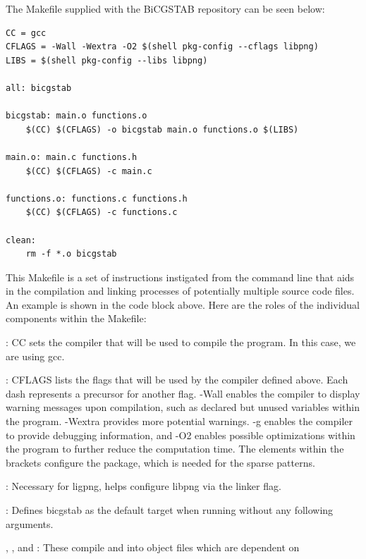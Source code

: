 \documentclass[12pt]{article}
\begin{document}
	The Makefile supplied with the BiCGSTAB repository can be seen below:

 	\begin{mdframed}[style=myboxstyleTerminal1]
		\begin{verbatim}
CC = gcc
CFLAGS = -Wall -Wextra -O2 $(shell pkg-config --cflags libpng)
LIBS = $(shell pkg-config --libs libpng)

all: bicgstab

bicgstab: main.o functions.o
	$(CC) $(CFLAGS) -o bicgstab main.o functions.o $(LIBS)

main.o: main.c functions.h
	$(CC) $(CFLAGS) -c main.c

functions.o: functions.c functions.h
	$(CC) $(CFLAGS) -c functions.c

clean:
	rm -f *.o bicgstab
		\end{verbatim}
	\end{mdframed}

This Makefile is a set of instructions instigated from the command line that aids in the compilation and linking processes of potentially multiple source code files. An example is shown in the code block above. Here are the roles of the individual components within the Makefile:

: CC sets the compiler that will be used to compile the program. In this case, we are using gcc.

: CFLAGS lists the flags that will be used by the compiler defined above. Each dash represents a precursor for another flag.  -Wall enables the compiler to display warning messages upon compilation, such as declared but unused variables within the program. -Wextra provides more potential warnings. -g enables the compiler to provide debugging information, and -O2 enables possible optimizations within the program to further reduce the computation time. The elements within the brackets configure the  package, which is needed for the sparse patterns.

: Necessary for ligpng, helps configure libpng via the linker flag.

: Defines bicgstab as the default target when running  without any following arguments.

, , and : These compile  and  into object files which are dependent on 
\end{document}
